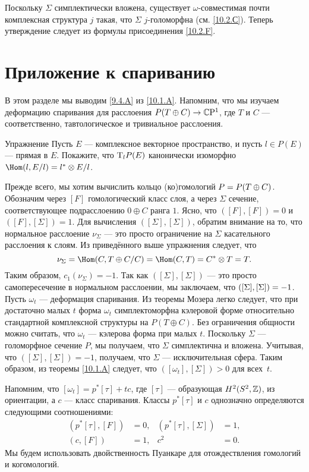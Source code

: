 Поскольку $\Sigma$ симплектически вложена, существует $\omega$-совместимая почти комплексная структура $j$ такая, что $\Sigma$ $j$-голоморфна (см. \ref{10.2.С}).
Теперь утверждение следует из формулы присоединения \ref{10.2.F}.
\qeds


\section{Приложение к спариванию}

В этом разделе мы выводим \ref{9.4.A} из \ref{10.1.A}.
Напомним, что мы изучаем деформацию спаривания для расслоения $P(T \oplus C) \to \mathbb{C}\mathrm{P}^1$, где $T$ и $C$ --- соответственно, тавтологическое и тривиальное расслоения.

\begin{ex*}{Упражнение}
Пусть $E$ --- комплексное векторное пространство, и пусть $l \in P(E)$ --- прямая в $E$.
Покажите, что $\mathrm{T}_l P(E)$ канонически изоморфно $\Hom(l, E/l) = l^\ast \otimes E/l$.
\end{ex*}

Прежде всего, мы хотим вычислить кольцо (ко)гомологий $P \z= P(T \oplus C)$.
Обозначим через $[F]$ гомологический класс слоя, а через $\Sigma$ сечение, соответствующее подрасслоению $0\oplus C$ ранга $1$.
Ясно, что $([F], [F]) = 0$ и $([F], [\Sigma]) = 1$.
Для вычисления $([\Sigma], [\Sigma])$, обратим внимание на то, что нормальное расслоение $\nu_\Sigma$ --- это просто ограничение на $\Sigma$ касательного расслоения к слоям.
Из приведённого выше упражнения следует, что 
\[\nu_\Sigma = \Hom(C, T \oplus C/C) = \Hom(C, T) = C^\ast \otimes T = T.\]
Таким образом, $c_1 (\nu_\Sigma) = -1$. 
Так как $([\Sigma], [\Sigma])$ --- это просто самопересечение в нормальном расслоении,
мы заключаем, что $([\Sigma], [\Sigma]) \z= -1$.
Пусть $\omega_t$ --- деформация спаривания.
Из теоремы Мозера \cite{MS} легко следует, что при достаточно малых $t$ форма $\omega_t$ симплектоморфна кэлеровой форме относительно стандартной комплексной структуры на $P(T \oplus C)$.
Без ограничения общности можно считать, что $\omega_t$ --- кэлерова форма при малых $t$.
Поскольку $\Sigma$ --- голоморфное сечение $P$, мы получаем, что $\Sigma$ симплектична и вложена.
Учитывая, что $([\Sigma], [\Sigma]) = -1$, получаем, что $\Sigma$ --- исключительная сфера.
Таким образом, из теоремы \ref{10.1.A} следует, что $([\omega_t], [\Sigma]) > 0$ для всех~$t$.

Напомним, что $[\omega_t] = p^\ast [\tau] + tc$, где $[\tau]$ --- образующая $H^2 (S^2, \mathbb{Z})$,  из ориентации, а $c$ --- класс спаривания.
Классы $p^\ast [\tau]$ и $c$ однозначно определяются следующими соотношениями: 
\begin{align*}
(p^\ast [\tau], [F]) &= 0,
&
(p^\ast [\tau], [\Sigma]) &= 1,
\\
(c, [F]) &= 1,
&
c^2 &= 0.
\end{align*}
Мы будем использовать двойственность Пуанкаре для отождествления гомологий и когомологий.

